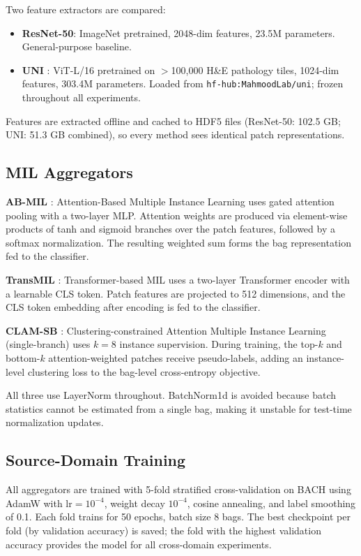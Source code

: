\documentclass[conference]{IEEEtran}
\begin{document}
Two feature extractors are compared:

\begin{itemize}
    \item \textbf{ResNet-50}: ImageNet pretrained, 2048-dim features, 23.5M parameters. General-purpose baseline.
    \item \textbf{UNI} \cite{chen2024uni}: ViT-L/16 pretrained on $>$100,000 H\&E pathology tiles, 1024-dim features, 303.4M parameters. Loaded from \texttt{hf-hub:MahmoodLab/uni}; frozen throughout all experiments.
\end{itemize}

Features are extracted offline and cached to HDF5 files (ResNet-50: 102.5 GB; UNI: 51.3 GB combined), so every method sees identical patch representations.

\subsection{MIL Aggregators}

\textbf{AB-MIL} \cite{ilse2018attention}: Attention-Based Multiple Instance Learning uses gated attention pooling with a two-layer MLP. Attention weights are produced via element-wise products of tanh and sigmoid branches over the patch features, followed by a softmax normalization. The resulting weighted sum forms the bag representation fed to the classifier.

\textbf{TransMIL} \cite{shao2021transmil}: Transformer-based MIL uses a two-layer Transformer encoder with a learnable CLS token. Patch features are projected to 512 dimensions, and the CLS token embedding after encoding is fed to the classifier.

\textbf{CLAM-SB} \cite{lu2021data}: Clustering-constrained Attention Multiple Instance Learning (single-branch) uses $k=8$ instance supervision. During training, the top-$k$ and bottom-$k$ attention-weighted patches receive pseudo-labels, adding an instance-level clustering loss to the bag-level cross-entropy objective.

All three use LayerNorm throughout. BatchNorm1d is avoided because batch statistics cannot be estimated from a single bag, making it unstable for test-time normalization updates.

\subsection{Source-Domain Training}

All aggregators are trained with 5-fold stratified cross-validation on BACH using AdamW \cite{loshchilov2019decoupled} with $\text{lr}=10^{-4}$, weight decay $10^{-4}$, cosine annealing, and label smoothing of 0.1. Each fold trains for 50 epochs, batch size 8 bags. The best checkpoint per fold (by validation accuracy) is saved; the fold with the highest validation accuracy provides the model for all cross-domain experiments.
\end{document}
